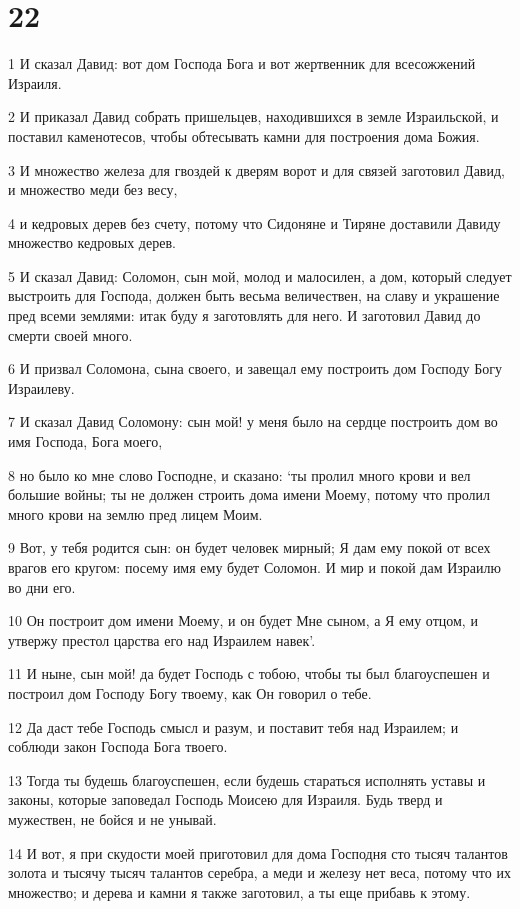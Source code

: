 \chapter{22}

\par 1 И сказал Давид: вот дом Господа Бога и вот жертвенник для всесожжений Израиля.
\par 2 И приказал Давид собрать пришельцев, находившихся в земле Израильской, и поставил каменотесов, чтобы обтесывать камни для построения дома Божия.
\par 3 И множество железа для гвоздей к дверям ворот и для связей заготовил Давид, и множество меди без весу,
\par 4 и кедровых дерев без счету, потому что Сидоняне и Тиряне доставили Давиду множество кедровых дерев.
\par 5 И сказал Давид: Соломон, сын мой, молод и малосилен, а дом, который следует выстроить для Господа, должен быть весьма величествен, на славу и украшение пред всеми землями: итак буду я заготовлять для него. И заготовил Давид до смерти своей много.
\par 6 И призвал Соломона, сына своего, и завещал ему построить дом Господу Богу Израилеву.
\par 7 И сказал Давид Соломону: сын мой! у меня было на сердце построить дом во имя Господа, Бога моего,
\par 8 но было ко мне слово Господне, и сказано: `ты пролил много крови и вел большие войны; ты не должен строить дома имени Моему, потому что пролил много крови на землю пред лицем Моим.
\par 9 Вот, у тебя родится сын: он будет человек мирный; Я дам ему покой от всех врагов его кругом: посему имя ему будет Соломон. И мир и покой дам Израилю во дни его.
\par 10 Он построит дом имени Моему, и он будет Мне сыном, а Я ему отцом, и утвержу престол царства его над Израилем навек'.
\par 11 И ныне, сын мой! да будет Господь с тобою, чтобы ты был благоуспешен и построил дом Господу Богу твоему, как Он говорил о тебе.
\par 12 Да даст тебе Господь смысл и разум, и поставит тебя над Израилем; и соблюди закон Господа Бога твоего.
\par 13 Тогда ты будешь благоуспешен, если будешь стараться исполнять уставы и законы, которые заповедал Господь Моисею для Израиля. Будь тверд и мужествен, не бойся и не унывай.
\par 14 И вот, я при скудости моей приготовил для дома Господня сто тысяч талантов золота и тысячу тысяч талантов серебра, а меди и железу нет веса, потому что их множество; и дерева и камни я также заготовил, а ты еще прибавь к этому.
